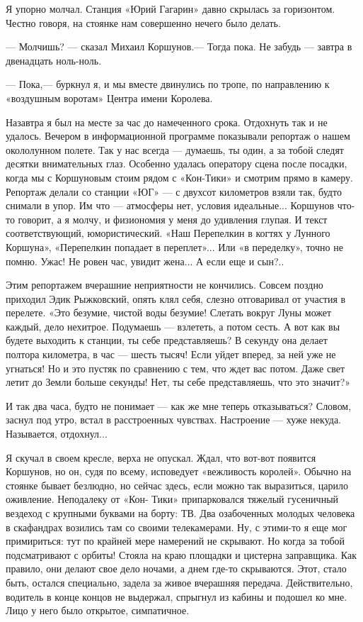 \documentclass[11pt,a4paper,oneside]{article}
\begin{document}
Я упорно молчал. Станция «Юрий Гагарин» давно скрылась за горизонтом. Честно говоря, на стоянке нам совершенно нечего было делать.

— Молчишь? — сказал Михаил Коршунов.— Тогда пока. Не забудь — завтра в двенадцать ноль-ноль.

— Пока,— буркнул я, и мы вместе двинулись по тропе, по направлению к «воздушным воротам» Центра имени Королева.

Назавтра я был на месте за час до намеченного срока. Отдохнуть так и не удалось. Вечером в информационной программе показывали репортаж о нашем окололунном полете. Так у нас всегда — думаешь, ты один, а за тобой следят десятки внимательных глаз. Особенно удалась оператору сцена после посадки, когда мы с Коршуновым стоим рядом с «Кон-Тики» и смотрим прямо в камеру. Репортаж делали со станции «ЮГ» — с двухсот километров взяли так, будто снимали в упор. Им что — атмосферы нет, условия идеальные... Коршунов что-то говорит, а я молчу, и физиономия у меня до удивления глупая. И текст соответствующий, юмористический. «Наш Перепелкин в когтях у Лунного Коршуна», «Перепелкин попадает в переплет»... Или «в переделку», точно не помню. Ужас! Не ровен час, увидит жена... А если еще и сын?..

Этим репортажем вчерашние неприятности не кончились. Совсем поздно приходил Эдик Рыжковский, опять клял себя, слезно отговаривал от участия в перелете. «Это безумие, чистой воды безумие! Слетать вокруг Луны может каждый, дело нехитрое. Подумаешь — взлететь, а потом сесть. А вот как вы будете выходить к станции, ты себе представляешь? В секунду она делает полтора километра, в час — шесть тысяч! Если уйдет вперед, за ней уже не угнаться! Но и это пустяк по сравнению с тем, что ждет вас потом. Даже свет летит до Земли больше секунды! Нет, ты себе представляешь, что это значит?»

И так два часа, будто не понимает — как же мне теперь отказываться? Словом, заснул под утро, встал в расстроенных чувствах. Настроение — хуже некуда. Называется, отдохнул...

Я скучал в своем кресле, верха не опускал. Ждал, что вот-вот появится Коршунов, но он, судя по всему, исповедует «вежливость королей». Обычно на стоянке бывает безлюдно, но сейчас здесь, если можно так выразиться, царило оживление. Неподалеку от «Кон- Тики» припарковался тяжелый гусеничный вездеход с крупными буквами на борту: ТВ. Два озабоченных молодых человека в скафандрах возились там со своими телекамерами. Ну, с этими-то я еще мог примириться: тут по крайней мере намерений не скрывают. Но когда за тобой подсматривают с орбиты! Стояла на краю площадки и цистерна заправщика. Как правило, они делают свое дело ночами, а днем где-то скрываются. Этот, стало быть, остался специально, задела за живое вчерашняя передача. Действительно, водитель в конце концов не выдержал, спрыгнул из кабины и подошел ко мне. Лицо у него было открытое, симпатичное.
\end{document}

